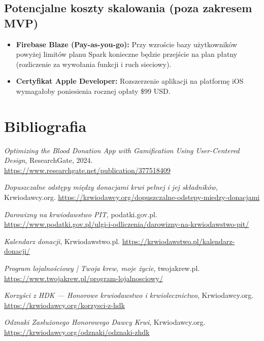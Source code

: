 \documentclass[11pt, a4paper]{article}
\begin{document}
\subsection{Potencjalne koszty skalowania (poza zakresem MVP)}

\begin{itemize}
  \item \textbf{Firebase Blaze (Pay-as-you-go):} Przy wzroście bazy użytkowników
        powyżej limitów planu Spark konieczne będzie przejście na plan płatny
        (rozliczenie za wywołania funkcji i ruch sieciowy).
  \item \textbf{Certyfikat Apple Developer:} Rozszerzenie aplikacji na platformę
        iOS wymagałoby poniesienia rocznej opłaty \$99 USD.
\end{itemize}
\section*{Bibliografia}

\begin{enumerate}[label={[\arabic*]}]
  \item \textit{Optimizing the Blood Donation App with Gamification Using User-Centered Design},
        ResearchGate, 2024. \url{https://www.researchgate.net/publication/377518409}

  \item \textit{Dopuszczalne odstępy między donacjami krwi pełnej i jej składników},
        Krwiodawcy.org. \url{https://krwiodawcy.org/dopuszczalne-odstepy-miedzy-donacjami}

  \item \textit{Darowizny na krwiodawstwo PIT}, podatki.gov.pl.
        \url{https://www.podatki.gov.pl/ulgi-i-odliczenia/darowizny-na-krwiodawstwo-pit/}

  \item \textit{Kalendarz donacji}, Krwiodawstwo.pl.
        \url{https://krwiodawstwo.pl/kalendarz-donacji/}

  \item \textit{Program lojalnościowy | Twoja krew, moje życie}, twojakrew.pl.
        \url{https://www.twojakrew.pl/program-lojalnosciowy/}

  \item \textit{Korzyści z HDK — Honorowe krwiodawstwo i krwiolecznictwo}, Krwiodawcy.org.
        \url{https://krwiodawcy.org/korzysci-z-hdk}

  \item \textit{Odznaki Zasłużonego Honorowego Dawcy Krwi}, Krwiodawcy.org.
        \url{https://krwiodawcy.org/odznaki/odznaki-zhdk}
\end{enumerate}
\end{document}
